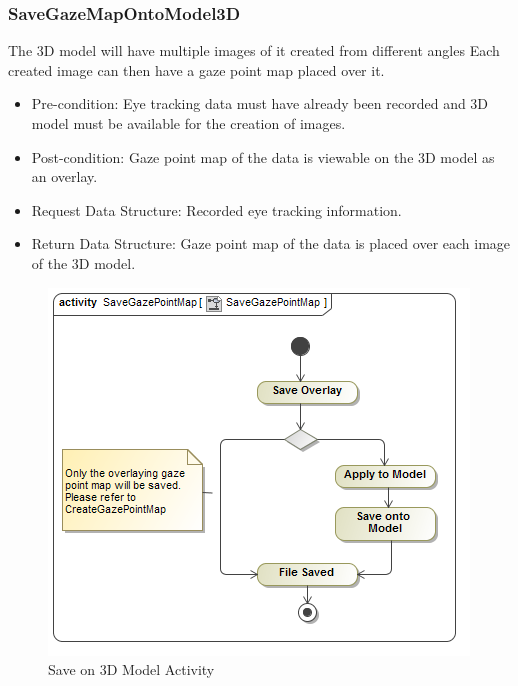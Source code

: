 	\subsubsection{SaveGazeMapOntoModel3D}
	The 3D model will have multiple images of it created from different angles Each created image can then have a gaze point map placed over it.
	\begin{itemize}
		\item Pre-condition: Eye tracking data must have already been recorded and 3D model must be available for the creation of images.
		\item Post-condition: Gaze point map of the data is viewable on the 3D model as an overlay.
		\item Request Data Structure: Recorded eye tracking information.
		\item Return Data Structure: Gaze point map of the data is placed over each image of the 3D model.
	\end{itemize}
	\begin{figure}[!ht]
		\centering	
		\includegraphics[scale=0.5]{Diagrams/Activity_Diagram__SaveGazePointMap__SaveGazePointMap.png}	
		\caption{Save on 3D Model Activity}
	\end{figure}	
	
		
